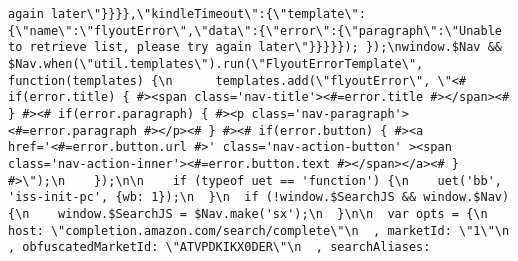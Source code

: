 \documentclass[
]{article}
\begin{document}
\begin{verbatim}
again later\"}}}},\"kindleTimeout\":{\"template\":{\"name\":\"flyoutError\",\"data\":{\"error\":{\"paragraph\":\"Unable to retrieve list, please try again later\"}}}}}); });\nwindow.$Nav && $Nav.when(\"util.templates\").run(\"FlyoutErrorTemplate\", function(templates) {\n      templates.add(\"flyoutError\", \"<# if(error.title) { #><span class='nav-title'><#=error.title #></span><# } #><# if(error.paragraph) { #><p class='nav-paragraph'><#=error.paragraph #></p><# } #><# if(error.button) { #><a href='<#=error.button.url #>' class='nav-action-button' ><span class='nav-action-inner'><#=error.button.text #></span></a><# } #>\");\n    });\n\n    if (typeof uet == 'function') {\n    uet('bb', 'iss-init-pc', {wb: 1});\n  }\n  if (!window.$SearchJS && window.$Nav) {\n    window.$SearchJS = $Nav.make('sx');\n  }\n\n  var opts = {\n    host: \"completion.amazon.com/search/complete\"\n  , marketId: \"1\"\n  , obfuscatedMarketId: \"ATVPDKIKX0DER\"\n  , searchAliases: 
\end{verbatim}
\end{document}
